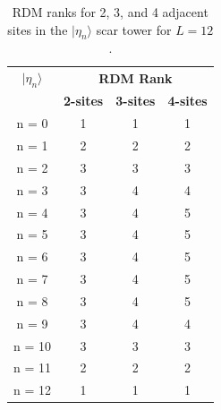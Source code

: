 \documentclass[11pt]{article}
\begin{document}
\begin{itemize}
\begin{itemize}
         \begin{table}[H]
	\centering
	\begin{tabular}{|c|ccc|}
	\hline
	\textbf{$|\eta_n\rangle$} & \multicolumn{3}{c|}{\textbf{RDM Rank}} \\
	\cline{2-4}
	& \textbf{2-sites} & \textbf{3-sites} & \textbf{4-sites}\\
	\hline
	 n = 0 & 1 & 1 & 1 \\
	 n = 1 & 2 & 2 & 2 \\
	 n = 2 & 3 & 3 & 3 \\
	 n = 3 & 3 & 4 & 4 \\
	 n = 4 & 3 & 4 & 5 \\  
	 n = 5 & 3 & 4 & 5 \\
	 n = 6 & 3 & 4 & 5 \\
	 n = 7 & 3 & 4 & 5 \\
	 n = 8 & 3 & 4 & 5 \\
	 n = 9 & 3 & 4 & 4 \\
	 n = 10 & 3 & 3 & 3 \\
	 n = 11 & 2 & 2 & 2 \\
	 n = 12 & 1 & 1 & 1 \\
	\hline
	\end{tabular}
	\caption{RDM ranks for 2, 3, and 4 adjacent sites in the $|\eta_n\rangle$ scar tower for $L=12$.}
	\label{tab:ranks21}
	\end{table}

\begin{table}[H]
\centering


\end{table}
\end{itemize}
\end{itemize}
\end{document}
